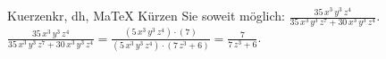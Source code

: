 \begin{MAufgabe}{Kuerzen}{kr, dh, MaTeX}
K\"urzen Sie soweit m\"oglich: $\frac{35\, x^3\, y^3\, z^4}{35\, x^3\, y^3\, z^7 + 30\, x^3\, y^3\, z^4}$.\\ 
\ifLsg\MLoesung
\quad $\frac{35\, x^3\, y^3\, z^4}{35\, x^3\, y^3\, z^7 + 30\, x^3\, y^3\, z^4}=\frac{(5\, x^3\, y^3\, z^4)\cdot(7)}{(5\, x^3\, y^3\, z^4)\cdot(7\, z^3 + 6)}=\frac{7}{7\, z^3 + 6}$.\else\relax\fi
 \end{MAufgabe}